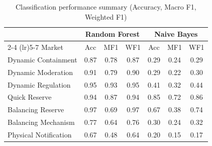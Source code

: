 \documentclass[12pt,a4paper]{article}
\begin{document}

\begin{table}[H]
\centering
\caption{Classification performance summary (Accuracy, Macro F1, Weighted F1)}
\label{tab:class_report}
\begin{tabular}{@{}lcccccc@{}}
\toprule
& \multicolumn{3}{c}{Random Forest} & \multicolumn{3}{c}{Naive Bayes} \\
\cmidrule(lr){2-4} \cmidrule(lr){5-7}
Market & Acc & MF1 & WF1 & Acc & MF1 & WF1 \\
\midrule
Dynamic Containment     & 0.87 & 0.78 & 0.87 & 0.29 & 0.24 & 0.29 \\
Dynamic Moderation      & 0.91 & 0.79 & 0.90 & 0.29 & 0.22 & 0.30 \\
Dynamic Regulation      & 0.95 & 0.93 & 0.95 & 0.41 & 0.32 & 0.44 \\
Quick Reserve           & 0.94 & 0.87 & 0.94 & 0.85 & 0.72 & 0.86 \\
Balancing Reserve       & 0.97 & 0.69 & 0.97 & 0.67 & 0.38 & 0.74 \\
Balancing Mechanism     & 0.77 & 0.64 & 0.76 & 0.30 & 0.24 & 0.32 \\
Physical Notification   & 0.67 & 0.48 & 0.64 & 0.20 & 0.15 & 0.17 \\
\bottomrule
\end{tabular}
\end{table}
\end{document}
